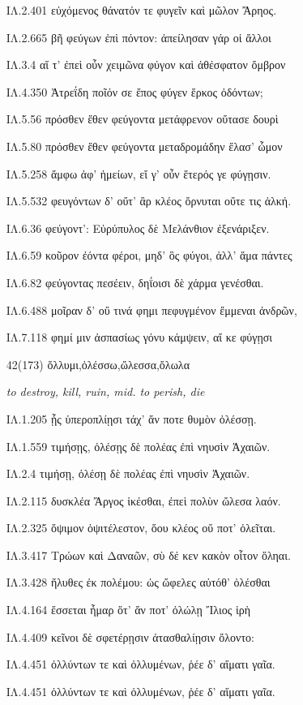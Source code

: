 \begin{enumerate}
{ΙΛ.2.401 εὐχόμενος θάνατόν τε φυγεῖν καὶ μῶλον Ἄρηος.

ΙΛ.2.665 βῆ φεύγων ἐπὶ πόντον: ἀπείλησαν γάρ οἱ ἄλλοι

ΙΛ.3.4 αἵ τ' ἐπεὶ οὖν χειμῶνα φύγον καὶ ἀθέσφατον ὄμβρον

ΙΛ.4.350 Ἀτρεΐδη ποῖόν σε ἔπος φύγεν ἕρκος ὀδόντων;

ΙΛ.5.56 πρόσθεν ἕθεν φεύγοντα μετάφρενον οὔτασε δουρὶ

ΙΛ.5.80 πρόσθεν ἕθεν φεύγοντα μεταδρομάδην ἔλασ' ὦμον

ΙΛ.5.258 ἄμφω ἀφ' ἡμείων, εἴ γ' οὖν ἕτερός γε φύγῃσιν.

ΙΛ.5.532 φευγόντων δ' οὔτ' ἂρ κλέος ὄρνυται οὔτε τις ἀλκή.

ΙΛ.6.36 φεύγοντ': Εὐρύπυλος δὲ Μελάνθιον ἐξενάριξεν.

ΙΛ.6.59 κοῦρον ἐόντα φέροι, μηδ' ὃς φύγοι, ἀλλ' ἅμα πάντες

ΙΛ.6.82 φεύγοντας πεσέειν, δηΐοισι δὲ χάρμα γενέσθαι.

ΙΛ.6.488 μοῖραν δ' οὔ τινά φημι πεφυγμένον ἔμμεναι ἀνδρῶν,

ΙΛ.7.118 φημί μιν ἀσπασίως γόνυ κάμψειν, αἴ κε φύγῃσι

}

\clearpage
\item[\large 42(173)]{\large \g ὄλλυμι,ὀλέσσω,ὤλεσσα,ὄλωλα     }

\hspace{0.2cm} \textit{  to destroy, kill, ruin, mid. to perish, die }

{\g
ΙΛ.1.205 ᾗς ὑπεροπλίῃσι τάχ' ἄν ποτε θυμὸν ὀλέσσῃ.

ΙΛ.1.559 τιμήσῃς, ὀλέσῃς δὲ πολέας ἐπὶ νηυσὶν Ἀχαιῶν.

ΙΛ.2.4 τιμήσῃ, ὀλέσῃ δὲ πολέας ἐπὶ νηυσὶν Ἀχαιῶν.

ΙΛ.2.115 δυσκλέα Ἄργος ἱκέσθαι, ἐπεὶ πολὺν ὤλεσα λαόν.

ΙΛ.2.325 ὄψιμον ὀψιτέλεστον, ὅου κλέος οὔ ποτ' ὀλεῖται.

ΙΛ.3.417 Τρώων καὶ Δαναῶν, σὺ δέ κεν κακὸν οἶτον ὄληαι.

ΙΛ.3.428 ἤλυθες ἐκ πολέμου: ὡς ὤφελες αὐτόθ' ὀλέσθαι

ΙΛ.4.164 ἔσσεται ἦμαρ ὅτ' ἄν ποτ' ὀλώλῃ Ἴλιος ἱρὴ

ΙΛ.4.409 κεῖνοι δὲ σφετέρῃσιν ἀτασθαλίῃσιν ὄλοντο:

ΙΛ.4.451 ὀλλύντων τε καὶ ὀλλυμένων, ῥέε δ' αἵματι γαῖα.

ΙΛ.4.451 ὀλλύντων τε καὶ ὀλλυμένων, ῥέε δ' αἵματι γαῖα.

}
\end{enumerate}
